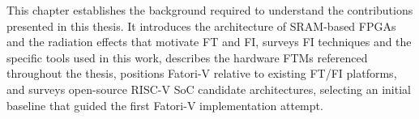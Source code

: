 This chapter establishes the background required to understand the contributions presented in this thesis. It introduces the architecture of \ac{SRAM}-based \acp{FPGA} and the radiation effects that motivate \ac{FT} and \ac{FI}, surveys \ac{FI} techniques and the specific tools used in this work, describes the hardware \acp{FTM} referenced throughout the thesis, positions \ac{Fatori-V} relative to existing \ac{FT}/\ac{FI} platforms, and surveys open-source \ac{RISC-V} \ac{SoC} candidate architectures, selecting an initial baseline that guided the first \ac{Fatori-V} implementation attempt.
